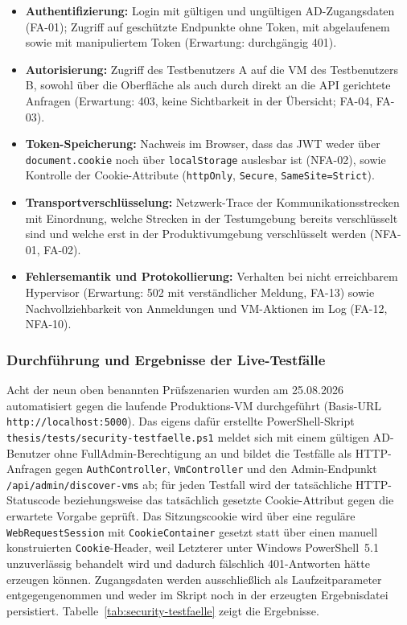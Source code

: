 \documentclass[12pt,a4paper]{article}
\begin{document}
\begin{itemize}
  \item \textbf{Authentifizierung:} Login mit gültigen und ungültigen AD-Zugangsdaten (FA-01); Zugriff auf geschützte Endpunkte ohne Token, mit abgelaufenem sowie mit manipuliertem Token (Erwartung: durchgängig 401).
  \item \textbf{Autorisierung:} Zugriff des Testbenutzers A auf die VM des Testbenutzers B, sowohl über die Oberfläche als auch durch direkt an die API gerichtete Anfragen (Erwartung: 403, keine Sichtbarkeit in der Übersicht; FA-04, FA-03).
  \item \textbf{Token-Speicherung:} Nachweis im Browser, dass das JWT weder über \texttt{document.cookie} noch über \texttt{localStorage} auslesbar ist (NFA-02), sowie Kontrolle der Cookie-Attribute (\texttt{httpOnly}, \texttt{Secure}, \texttt{SameSite=Strict}).
  \item \textbf{Transportverschlüsselung:} Netzwerk-Trace der Kommunikationsstrecken mit Einordnung, welche Strecken in der Testumgebung bereits verschlüsselt sind und welche erst in der Produktivumgebung verschlüsselt werden (NFA-01, FA-02).
  \item \textbf{Fehlersemantik und Protokollierung:} Verhalten bei nicht erreichbarem Hypervisor (Erwartung: 502 mit verständlicher Meldung, FA-13) sowie Nachvollziehbarkeit von Anmeldungen und VM-Aktionen im Log (FA-12, NFA-10).
\end{itemize}

\subsubsection{Durchführung und Ergebnisse der Live-Testfälle}
\label{sec:security-testfaelle-ergebnisse}

Acht der neun oben benannten Prüfszenarien wurden am 25.08.2026 automatisiert gegen die laufende Produktions-VM durchgeführt (Basis-URL \texttt{http://localhost:5000}). Das eigens dafür erstellte PowerShell-Skript \texttt{thesis/tests/security-testfaelle.ps1} meldet sich mit einem gültigen AD-Benutzer ohne FullAdmin-Berechtigung an und bildet die Testfälle als HTTP-Anfragen gegen \texttt{AuthController}, \texttt{VmController} und den Admin-Endpunkt \texttt{/api/admin/discover-vms} ab; für jeden Testfall wird der tatsächliche HTTP-Statuscode beziehungsweise das tatsächlich gesetzte Cookie-Attribut gegen die erwartete Vorgabe geprüft. Das Sitzungscookie wird über eine reguläre \texttt{WebRequestSession} mit \texttt{CookieContainer} gesetzt statt über einen manuell konstruierten \texttt{Cookie}-Header, weil Letzterer unter Windows PowerShell~5.1 unzuverlässig behandelt wird und dadurch fälschlich 401-Antworten hätte erzeugen können. Zugangsdaten werden ausschließlich als Laufzeitparameter entgegengenommen und weder im Skript noch in der erzeugten Ergebnisdatei persistiert. Tabelle~\ref{tab:security-testfaelle} zeigt die Ergebnisse.
\end{document}
